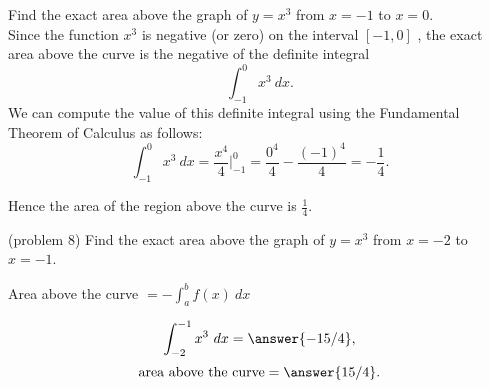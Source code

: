 \documentclass[handout]{ximera}
\begin{document}
\begin{example}[example 8]
Find the exact area above the graph of $y = x^3$ from $x = -1$ to $x = 0$. \\
Since the function $x^3$ is negative (or zero) on the interval $[-1, 0]$ , the exact area above the curve is the negative of the definite integral 
\[\int_{-1}^0 x^3 \ dx.\]
We can compute the value of this definite integral using the Fundamental Theorem of Calculus as follows:
\[\int_{-1}^0 x^3 \ dx = \frac{x^4}{4} \Big|_{-1}^0 = \frac{0^4}{4} - \frac{(-1)^4}{4} = -\frac14.\]

Hence the area of the region above the curve is $\frac14$.


\begin{image}
\end{image}
\end{example}


\begin{problem}(problem 8)
Find the exact area above the graph of $y = x^3$ from $x = -2$ to $x = -1$. \\
\begin{hint}
Area above the curve $= -\int_a^b f(x) \ dx$
\end{hint}
\[\int_{-2}^{-1} x^3 \ dx = \answer{-15/4},\]
\[\text{area above the curve} = \answer{15/4}.\]
\end{problem}
\end{document}
